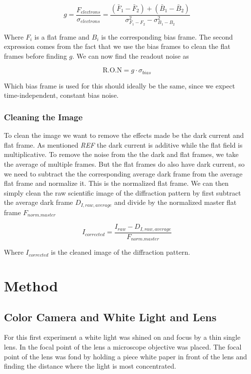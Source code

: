 \documentclass{emulateapj}
\begin{document}
\begin{equation}
g = \frac{F_{electrons}}{\sigma_{electrons}} = \frac{(\bar{F}_1 - \bar{F}_2) + (\bar{B}_1-\bar{B}_2)}{\sigma_{F_1 - F_2}^2 - \sigma_{B_1 - B_2}^2}
\end{equation}

Where $F_i$ is a flat frame and $B_i$ is the corresponding bias frame. The second expression comes from the fact that we use the bias frames to clean the flat frames before finding $g$. We can now find the readout noise as

\begin{equation}
\text{R.O.N} = g\cdot\sigma_{bias}
\end{equation}

Which bias frame is used for this should ideally be the same, since we expect time-independent, constant bias noise.

\subsubsection{Cleaning the Image}
To clean the image we want to remove the effects made be the dark current and flat frame. As mentioned \emph{REF} the dark current is additive while the flat field is multiplicative. To remove the noise from the the dark and flat frames, we take the average of multiple frames. But the flat frames do also have dark current, so we need to subtract the the corresponding average dark frame from the average flat frame and normalize it. This is the normalized flat frame. We can then simply clean the raw scientific image of the diffraction pattern by first subtract the average dark frame $D_{I,raw,average}$ and divide by the normalized master flat frame $F_{norm. master}$

\begin{equation}
I_{corrected} = \frac{I_{raw} - D_{I,raw,average}}{F_{norm. master}}
\label{eq:ICorr}
\end{equation}

Where $I_{corrected}$ is the cleaned image of the diffraction pattern.
\section{Method}
\label{sec:method}

\subsection{Color Camera and White Light and Lens}
For this first experiment a white light was shined on and focus by a thin single lens. In the focal point of the lens a microscope objective was placed. The focal point of the lens was fond by holding a piece white paper in front of the lens and finding the distance where the light is most concentrated. 
\end{document}
